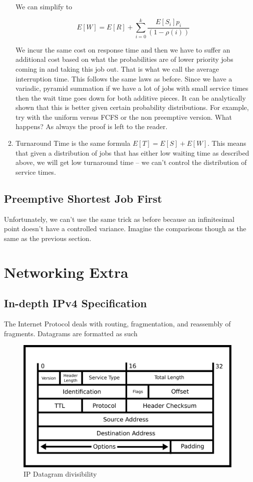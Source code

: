 \begin{enumerate}
  We can simplify to

  \[
  E[W] = E[R] + \sum\limits_{i=0}^k \frac{E[S_i]p_i}{(1 - \rho(i))}
  \]

  We incur the same cost on response time and then we have to suffer an additional cost based on what the probabilities are of lower priority jobs coming in and taking this job out.
  That is what we call the average interruption time.
  This follows the same laws as before.
  Since we have a variadic, pyramid summation if we have a lot of jobs with small service times then the wait time goes down for both additive pieces.
  It can be analytically shown that this is better given certain probability distributions.
  For example, try with the uniform versus FCFS or the non preemptive version.
  What happens?
  As always the proof is left to the reader.

\item Turnaround Time is the same formula $E[T] = E[S] + E[W]$. This means that given a distribution of jobs that has either low waiting time as described above, we will get low turnaround time -- we can't control the distribution of service times.
\end{enumerate}

\subsection{Preemptive Shortest Job First}

Unfortunately, we can't use the same trick as before because an infinitesimal point doesn't have a controlled variance.
Imagine the comparisons though as the same as the previous section.

\section{Networking Extra}


\subsection{In-depth IPv4 Specification}

The Internet Protocol deals with routing, fragmentation, and reassembly of fragments.
Datagrams are formatted as such

\begin{figure}[H]
  \centering
\includegraphics[width=.8\textwidth]{appendix/drawings/ip_datagram.eps}
\caption{IP Datagram divisibility}
\end{figure}

